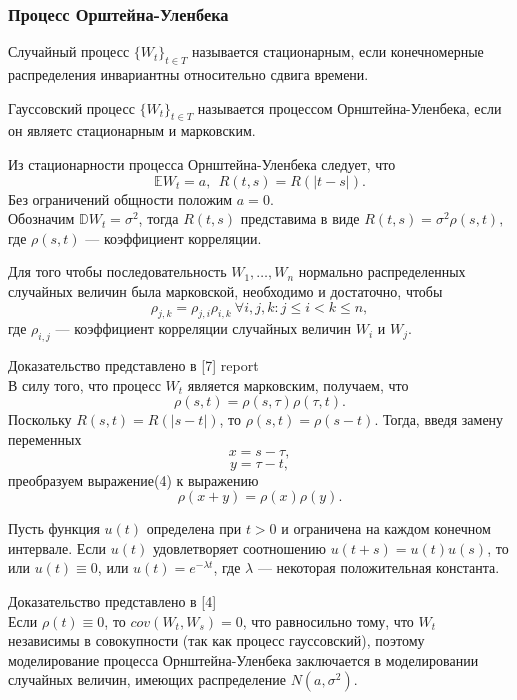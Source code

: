 \documentclass[11pt]{article}
\begin{document}
\subsubsection{Процесс Орштейна-Уленбека}
\begin{opr}
	Случайный процесс $\{W_t \}_{t \in T}$ называется стационарным, если конечномерные распределения инвариантны относительно сдвига времени.
\end{opr}
\begin{opr}
	Гауссовский процесс $\{ W_t\}_{t \in T}$ называется процессом Орнштейна-Уленбека, если он являетс стационарным и марковским.
\end{opr}
Из стационарности процесса Орнштейна-Уленбека следует, что
\[ \mathbb{E}W_t = a, \ \ R(t,s) = R(|t - s|).  \]
Без ограничений общности положим $a = 0$.\\
Обозначим $\mathbb{D}W_t = \sigma^2$, тогда $R(t,s)$ представима в виде $R(t,s) = \sigma^2 \rho(s,t),$ где $\rho(s,t)$ --- коэффициент корреляции.
\begin{theorem}
	Для того чтобы последовательность $W_1,\dots,W_n$ нормально распределенных случайных величин была марковской, необходимо и достаточно, чтобы 
	\[ \rho_{j,k} = \rho_{j,i}\rho_{i,k} \ \forall i,j,k: j \leq i < k \leq n, \]
	где $\rho_{i,j}$ --- коэффициент корреляции случайных величин $W_i$ и $W_j$.
\end{theorem}
Доказательство представлено в [7] report \\
В силу того, что процесс $W_t$ является марковским, получаем, что
\begin{equation}
\rho(s,t) = \rho(s,\tau)\rho(\tau,t).
\end{equation}
Поскольку $R(s,t) = R(|s - t|)$, то $\rho(s,t) = \rho(s - t).$ Тогда, введя замену переменных
\[ x = s - \tau, \]
\[ y = \tau - t, \]
преобразуем выражение(4) к выражению
\[ \rho(x + y) = \rho(x)\rho(y). \]
\begin{theorem}
	Пусть функция $u(t)$ определена при $t > 0$ и ограничена на каждом конечном интервале. Если $u(t)$ удовлетворяет соотношению $u(t + s) = u(t)u(s)$, то или $u(t) \equiv 0$, или $u(t) = e^{-\lambda t}$, где $\lambda$ --- некоторая положительная константа.
\end{theorem}
Доказательство представлено в [4]\\
Если $\rho(t) \equiv 0$, то $cov(W_t,W_s) = 0$, что равносильно тому, что $W_t$ независимы в совокупности (так как процесс гауссовский), поэтому моделирование процесса Орнштейна-Уленбека заключается в моделировании случайных величин, имеющих распределение $N(a,\sigma^2)$. \\
\end{document}
